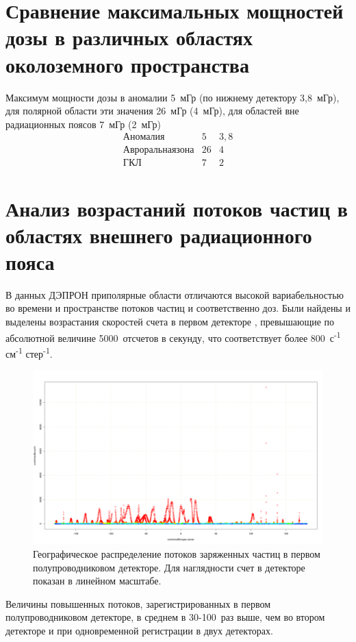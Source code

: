 \section{Сравнение максимальных мощностей дозы в различных областях околоземного пространства}
Максимум мощности дозы в аномалии 5~мГр (по нижнему детектору 3,8~мГр), для полярной области эти значения 26~мГр (4~мГр), для областей вне радиационных поясов 7~мГр (2~мГр)
\[ 
\begin{array}{ccc}
	Аномалия	& 5 & 3,8 \\ 
	Авроральная зона	& 26 & 4 \\ 
	ГКЛ	& 7 & 2
\end{array} 
 \]

\section{Анализ возрастаний потоков частиц в областях внешнего радиационного пояса}\label{sec:flash_analisys}
В  данных  ДЭПРОН приполярные области отличаются высокой вариабельностью во времени и пространстве потоков частиц и соответственно доз. Были найдены и выделены возрастания скоростей счета в первом детекторе	\label{fig:depronlatmap148}, превышающие по абсолютной величине 5000~отсчетов в секунду, что соответствует более 800~с\textsuperscript{-1} см\textsuperscript{-1} стер\textsuperscript{-1}. 
\begin{figure}[h]
	\centering
	\includegraphics[width=0.8\linewidth]{images/Flash/depron_lat_map_148}
	\caption{Географическое распределение потоков заряженных частиц в первом полупроводниковом детекторе. Для наглядности счет в детекторе показан в линейном масштабе.}
	\label{fig:depronlatmap148}
\end{figure}
Величины повышенных потоков, зарегистрированных в первом полупроводниковом детекторе, в среднем в 30-100~раз выше, чем во втором детекторе и при одновременной регистрации в двух детекторах.
